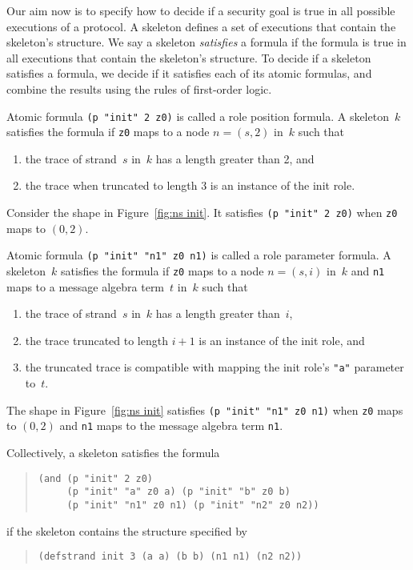 \documentclass[12pt]{article}
\begin{document}
Our aim now is to specify how to decide if a security goal is true in
all possible executions of a protocol.  A skeleton defines a set of
executions that contain the skeleton's structure.  We say a skeleton
\emph{satisfies} a formula if the formula is true in all executions
that contain the skeleton's structure.  To decide if a skeleton
satisfies a formula, we decide if it satisfies each of its atomic
formulas, and combine the results using the rules of first-order
logic.

Atomic formula \texttt{(p "init" 2 z0)} is called a role position
formula.  A skeleton~$k$ satisfies the formula if \texttt{z0} maps to
a node $n=(s,2)$ in~$k$ such that
\begin{enumerate}
\item the trace of strand~$s$ in~$k$ has a length greater than 2, and
\item the trace when truncated to length 3 is an instance of the init
  role.
\end{enumerate}
Consider the shape in Figure~\ref{fig:ns init}.  It satisfies
\texttt{(p "init" 2 z0)} when \texttt{z0} maps to $(0,2)$.

Atomic formula \texttt{(p "init" "n1" z0 n1)} is called a role
parameter formula.  A skeleton~$k$ satisfies the formula if
\texttt{z0} maps to a node $n=(s,i)$ in~$k$ and \texttt{n1} maps to a
message algebra term~$t$ in~$k$ such that
\begin{enumerate}
\item the trace of strand~$s$ in~$k$ has a length greater than~$i$,
\item the trace truncated to length $i+1$ is an instance of the
  init role, and
\item the truncated trace is compatible with mapping the init role's
  \texttt{"a"} parameter to~$t$.
\end{enumerate}
The shape in Figure~\ref{fig:ns init} satisfies \texttt{(p "init" "n1"
  z0 n1)} when \texttt{z0} maps to $(0,2)$ and \texttt{n1} maps to the
message algebra term \texttt{n1}.

Collectively, a skeleton satisfies the formula
\begin{quote}
\begin{verbatim}
(and (p "init" 2 z0)
     (p "init" "a" z0 a) (p "init" "b" z0 b)
     (p "init" "n1" z0 n1) (p "init" "n2" z0 n2))
\end{verbatim}
\end{quote}
if the skeleton contains the structure specified by
\begin{quote}
\begin{verbatim}
(defstrand init 3 (a a) (b b) (n1 n1) (n2 n2))
\end{verbatim}
\end{quote}
\end{document}
